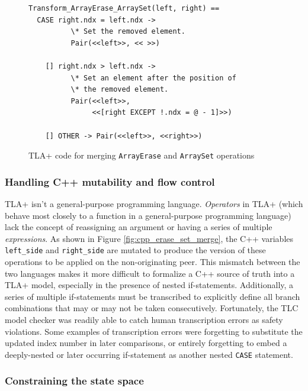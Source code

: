 \documentclass{vldb}
\begin{document}
\begin{figure}
\begin{verbatim}
Transform_ArrayErase_ArraySet(left, right) ==
  CASE right.ndx = left.ndx ->
          \* Set the removed element.
          Pair(<<left>>, << >>)

    [] right.ndx > left.ndx ->
          \* Set an element after the position of
          \* the removed element.
          Pair(<<left>>,
               <<[right EXCEPT !.ndx = @ - 1]>>)

    [] OTHER -> Pair(<<left>>, <<right>>)
\end{verbatim}
\caption{TLA+ code for merging \texttt{ArrayErase} and \texttt{ArraySet} operations}
\label{fig:tlaplus_erase_set_merge}
\end{figure}

\subsubsection{Handling C++ mutability and flow control}

TLA+ isn't a general-purpose programming language. \emph{Operators} in TLA+ (which behave most closely to a function in a general-purpose programming language) lack the concept of reassigning an argument or having a series of multiple \emph{expressions}. As shown in Figure \ref{fig:cpp_erase_set_merge}, the C++ variables \texttt{left\_side} and \texttt{right\_side} are mutated to produce the version of these operations to be applied on the non-originating peer. This mismatch between the two languages makes it more difficult to formalize a C++ source of truth into a TLA+ model, especially in the presence of nested if-statements. Additionally, a series of multiple if-statements must be transcribed to explicitly define all branch combinations that may or may not be taken consecutively. Fortunately, the TLC model checker was readily able to catch human transcription errors as safety violations. Some examples of transcription errors were forgetting to substitute the updated index number in later comparisons, or entirely forgetting to embed a deeply-nested or later occurring if-statement as another nested \texttt{CASE} statement.

\subsubsection{Constraining the state space}
\end{document}
